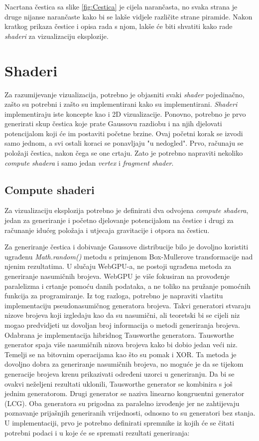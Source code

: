 \documentclass{foi}
\begin{document}
Nacrtana čestica sa slike \ref{fig:Cestica} je cijela narančasta, no svaka strana je druge nijanse narančaste kako bi se lakše vidjele različite strane piramide. Nakon kratkog prikaza čestice i opisa rada s njom, lakše će biti shvatiti kako rade \textit{shaderi} za vizualizaciju eksplozije.

\section{Shaderi}
Za razumijevanje vizualizacija, potrebno je objasniti svaki \textit{shader} pojedinačno, zašto su potrebni i zašto su implementirani kako su implementirani. \textit{Shaderi} implementiraju iste koncepte kao i 2D vizualizacije. Ponovno, potrebno je prvo generirati skup čestica koje prate Gaussovu razdiobu i na njih djelovati potencijalom koji će im postaviti početne brzine. Ovaj početni korak se izvodi samo jednom, a svi ostali koraci se ponavljaju "u nedogled". Prvo, računaju se položaji čestica, nakon čega se one crtaju. Zato je potrebno napraviti nekoliko \textit{compute shadera} i samo jedan \textit{vertex} i \textit{fragment shader}.

\subsection{Compute shaderi}
Za vizualizaciju eksplozija potrebno je definirati dva odvojena \textit{compute shadera}, jedan za generiranje i početno djelovanje potencijalom na čestice i drugi za računanje idućeg položaja i utjecaja gravitacije i otpora na česticu. 

Za generiranje čestica i dobivanje Gaussove distribucije bilo je dovoljno koristiti ugrađenu \textit{Math.random()} metodu s primjenom Box-Mullerove transformacije nad njenim rezultatima. U slučaju WebGPU-a, ne postoji ugrađena metoda za generiranje nasumičnih brojeva. WebGPU je više fokusiran na provođenje paralelizma i crtanje pomoću danih podataka, a ne toliko na pružanje pomoćnih funkcija za programiranje. Iz tog razloga, potrebno je napraviti vlastitu implementaciju pseudonasumičnog generatora brojeva. Takvi generatori stvaraju nizove brojeva koji izgledaju kao da su nasumični, ali teoretski bi se cijeli niz mogao predvidjeti uz dovoljan broj informacija o metodi generiranja brojeva. Odabrana je implementacija hibridnog Tausworthe generatora. Tausworthe generator spaja više nasumičnih nizova brojeva kako bi dobio jedan veći niz. Temelji se na bitovnim operacijama kao što su pomak i XOR. Ta metoda je dovoljno dobra za generiranje nasumičnih brojeva, no moguće je da se tijekom generacije brojeva krenu prikazivati određeni uzorci u generiranju. Da bi se ovakvi neželjeni rezultati uklonili, Tausworthe generator se kombinira s još jednim generatorom. Drugi generator se naziva linearno kongruentni generator (LCG). Oba generatora su prigodna za paralelno izvođenje jer ne zahtijevaju poznavanje prijašnjih generiranih vrijednosti, odnosno to su generatori bez stanja. U implementaciji, prvo je potrebno definirati spremnike iz kojih će se čitati potrebni podaci i u koje će se spremati rezultati generiranja:
\end{document}
